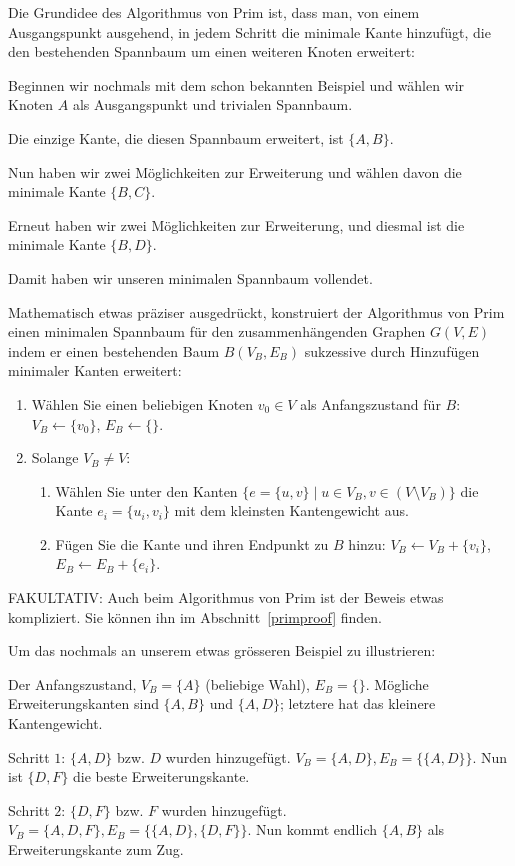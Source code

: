 \documentclass[12pt,a4paper]{report}
\theoremstyle{break}
\theoremstyle{plain}
\newcommand{\algostep}[2]{\noindent\parbox{4cm}{\scalebox{0.5}{\texttt{[image: \#1]}}}
  \hfill
  \parbox{7cm}{#2}
  \vskip -5mm
}
\begin{document}
Die Grundidee des Algorithmus von Prim ist, dass man, von einem
Ausgangspunkt ausgehend, in jedem Schritt die minimale Kante
hinzuf\"{u}gt, die den bestehenden Spannbaum um einen weiteren Knoten
erweitert:

\algostep{DemoSmallPrim0.pdf}{Beginnen wir nochmals mit dem schon bekannten
  Beispiel und w\"{a}hlen wir Knoten $A$ als Ausgangspunkt und
  trivialen Spannbaum.}
\algostep{DemoSmallPrim1.pdf}{Die einzige Kante, die diesen Spannbaum
  erweitert, ist $\{A, B\}$.}
\algostep{DemoSmallPrim2.pdf}{Nun haben wir zwei M\"{o}glichkeiten zur
  Erweiterung und w\"{a}hlen davon die minimale Kante $\{B,C\}$.}
\algostep{DemoSmallPrim3.pdf}{Erneut haben wir zwei M\"{o}glichkeiten
  zur Erweiterung, und diesmal ist die minimale Kante $\{B,D\}$.}
\algostep{DemoSmallPrim4.pdf}{Damit haben wir unseren minimalen
  Spannbaum vollendet.}

\newpage 
Mathematisch etwas pr\"{a}ziser ausgedr\"{u}ckt, konstruiert
der Algorithmus von Prim einen minimalen Spannbaum f\"{u}r den
zusammenh\"{a}ngenden Graphen $G(V,E)$ indem er einen bestehenden Baum
$B(V_B,E_B)$ sukzessive durch Hinzuf\"{u}gen minimaler Kanten
erweitert:

\begin{enumerate}
\item W\"{a}hlen Sie einen beliebigen Knoten $v_0\in V$ als
  Anfangszustand f\"{u}r $B$: $V_B \gets \{v_0\}$, $E_B \gets \{\}$.
\item Solange $V_B\neq V$:
\begin{enumerate}
\item \label{primsel} W\"{a}hlen Sie unter den Kanten $\{e = \{u,v\}\mid u\in V_B, v\in
  (V\!\setminus\!V_B)\}$ die Kante $e_i= \{u_i,v_i\}$ mit dem kleinsten
Kantengewicht aus.
\item F\"{u}gen Sie die Kante und ihren Endpunkt zu $B$ hinzu: $V_B \gets
  V_B+\{v_i\}$, $E_B \gets E_B+\{e_i\}$.
\end{enumerate}
\end{enumerate}

FAKULTATIV: Auch beim Algorithmus von Prim ist der Beweis etwas
kompliziert. Sie k\"{o}nnen ihn im Abschnitt~\ref{primproof} finden.

\newpage
Um das nochmals an unserem etwas gr\"{o}sseren Beispiel zu illustrieren:

\algostep{DemoPrim1.pdf}{Der Anfangszustand, $V_B = \{A\}$ (beliebige
  Wahl), $E_B = \{\}$. M\"{o}gliche Erweiterungskanten sind $\{A,B\}$
  und $\{A,D\}$; letztere hat das kleinere Kantengewicht.}
\algostep{DemoPrim2.pdf}{Schritt $1$: $\{A,D\}$ bzw. $D$ wurden
  hinzugef\"{u}gt. $V_B = \{A,D\}, E_B=\{\{A,D\}\}$. Nun ist $\{D,F\}$ die
  beste Erweiterungskante.}
\algostep{DemoPrim3.pdf}{Schritt $2$: $\{D,F\}$ bzw. $F$ wurden 
 hinzugef\"{u}gt. $V_B = \{A,D,F\}, E_B=\{\{A,D\}, \{D,F\}\}$. Nun kommt
 endlich $\{A,B\}$ als Erweiterungskante zum Zug.}
\end{document}
